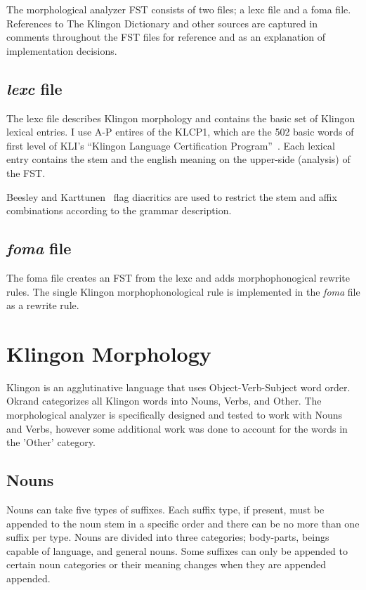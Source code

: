 \documentclass[11pt]{article}
\begin{document}
The morphological analyzer FST consists of two files; a lexc file and a foma file. References to The Klingon Dictionary and other sources are captured in comments throughout the FST files for reference and as an explanation of implementation decisions.

\subsection{\textit{lexc} file}

The lexc file describes Klingon morphology and contains the basic set of Klingon lexical entries. I use A-P entires of the KLCP1, which are the 502 basic words of first level of KLI's ``Klingon Language Certification Program''~\cite{Zrajm:12}. Each lexical entry contains the stem and the english meaning on the upper-side (analysis) of the FST.

Beesley and Karttunen~ flag diacritics are used to restrict the stem and affix combinations according to the grammar description.

\subsection{\textit{foma} file}

The foma file creates an FST from the lexc and adds morphophonogical rewrite rules. The single Klingon morphophonological rule is implemented in the \textit{foma} file as a rewrite rule.

\section{Klingon Morphology}

Klingon is an agglutinative language that uses Object-Verb-Subject word order. Okrand categorizes all Klingon words into Nouns, Verbs, and Other. The morphological analyzer is specifically designed and tested to work with Nouns and Verbs, however some additional work was done to account for the words in the 'Other' category.

\subsection {Nouns}

Nouns can take five types of suffixes. Each suffix type, if present, must be appended to the noun stem in a specific order and there can be no more than one suffix per type. Nouns are divided into three categories; body-parts, beings capable of language, and general nouns. Some suffixes can only be appended to certain noun categories or their meaning changes when they are appended appended.
\end{document}
